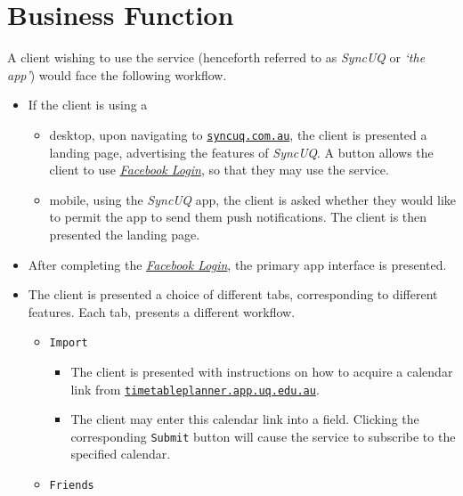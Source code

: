 \documentclass[11pt,a4paper]{report}
\begin{document}
\section{Business Function}

A client wishing to use the service (henceforth referred to as \textit{SyncUQ} or \textit{`the app'}) would face the following workflow.

\begin{itemize}
    \item If the client is using a 
        \begin{itemize} 
            \item desktop, upon navigating to \href{http://www.syncuq.com.au/}{\texttt{syncuq.com.au}}, the client is presented a landing page, advertising the features of \textit{SyncUQ}. A button allows the client to use \href{https://developers.facebook.com/docs/facebook-login}{\textit{Facebook Login}}, so that they may use the service.
            \item mobile, using the \textit{SyncUQ} app, the client is asked whether they would like to permit the app to send them push notifications. The client is then presented the landing page.
        \end{itemize}
    \item After completing the \href{https://developers.facebook.com/docs/facebook-login}{\textit{Facebook Login}}, the primary app interface is presented.
    \item The client is presented a choice of different tabs, corresponding to different features. Each tab, presents a different workflow.
        \begin{itemize}
            \item \texttt{Import}
                \begin{itemize}
                    \item The client is presented with instructions on how to acquire a calendar link from \href{http://timetableplanner.app.uq.edu.au/}{\texttt{timetableplanner.app.uq.edu.au}}.
                    \item The client may enter this calendar link into a field. Clicking the corresponding \texttt{Submit} button will cause the service to subscribe to the specified calendar.
                \end{itemize}
            \item \texttt{Friends}
                \begin{itemize}

\end{itemize}
\end{itemize}
\end{itemize}
\end{document}
